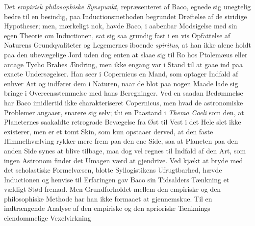 \documentclass[12pt,a4paper]{book}
\begin{document}
Det \emph{empirisk philosophiske Synspunkt}, repræsenteret af Baco,
egnede sig unegtelig bedre til en besindig, paa Inductionsmethoden
begrundet Drøftelse af de stridige Hypotheser; men, mærkeligt nok,
havde Baco, i aabenbar Modsigelse med sin egen Theorie om Inductionen,
sat sig saa grundig fast i en vis Opfattelse af Naturens
Grundqvaliteter og Legemernes iboende \emph{spiritus}, at han ikke
alene holdt paa den ubevægelige Jord uden dog enten at slaae sig til Ro
hos Ptolemæus eller antage Tycho Brahes Ændring, men ikke engang var i
Stand til at gaae ind paa exacte Undersøgelser. Han seer i Copernicus
en Mand, som optager Indfald af enhver Art og indfører dem i Naturen,
naar de blot paa nogen Maade lade sig bringe i Overeensstemmelse med
hans Beregninger. Ved en saadan Bedømmelse har Baco imidlertid ikke
charakteriseret Copernicus, men hvad de astronomiske Problemer angaaer,
snarere sig selv; thi en Paastand i \textit{Thema Coeli} som den, at
Planeternes saakaldte retrograde Bevægelse fra Øst til Vest i det Hele
slet ikke existerer, men er et tomt Skin, som kun opstaaer derved, at
den faste Himmelhvælving rykker mere frem paa den ene Side, saa at
Planeten paa den anden Side synes at blive tilbage, maa dog vel regnes
til Indfald af den Art, som ingen Astronom finder det Umagen værd at
gjendrive. Ved kjækt at bryde med det scholastiske Formelvæsen, blotte
Syllogistikens Ufrugtbarhed, hævde Inductionen og henvise til
Erfaringen gav Baco sin Tidsalders Tænkning et vældigt Stød fremad. Men
Grundforholdet mellem den empiriske og den philosophiske Methode har
han ikke formaaet at gjennemskue. Til en indtrængende Analyse af den
empiriske og den aprioriske Tænknings eiendommelige Vexelvirkning
\end{document}
